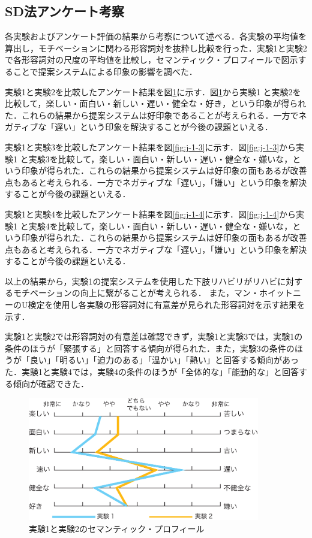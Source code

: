 \subsection{SD法アンケート考察}
各実験およびアンケート評価の結果から考察について述べる．各実験の平均値\cite{average}を算出し，モチベーションに関わる形容詞対を抜粋し比較を行った．実験1と実験2で各形容詞対の尺度の平均値を比較し，セマンティック・プロフィール\cite{sd_zu}で図示することで提案システムによる印象の影響を調べた．

実験1と実験2を比較したアンケート結果を図\ref{fig:j-1-2}に示す．図\ref{fig:j-1-2}から実験1 と実験2を比較して，楽しい・面白い・新しい・遅い・健全な・好き，という印象が得られた．これらの結果から提案システムは好印象であることが考えられる．一方でネガティブな「遅い」という印象を解決することが今後の課題といえる．


実験1と実験3を比較したアンケート結果を図\ref{fig:j-1-3}に示す．図\ref{fig:j-1-3}から実験1 と実験3を比較して，楽しい・面白い・新しい・遅い・健全な・嫌いな，という印象が得られた．これらの結果から提案システムは好印象の面もあるが改善点もあると考えられる．一方でネガティブな「遅い」，「嫌い」という印象を解決することが今後の課題といえる．


実験1と実験4を比較したアンケート結果を図\ref{fig:j-1-4}に示す．図\ref{fig:j-1-4}から実験1 と実験4を比較して，楽しい・面白い・新しい・遅い・健全な・嫌いな，という印象が得られた．これらの結果から提案システムは好印象の面もあるが改善点もあると考えられる．一方でネガティブな「遅い」，「嫌い」という印象を解決することが今後の課題といえる．


以上の結果から，実験1の提案システムを使用した下肢リハビリがリハビに対するモチベーションの向上に繋がることが考えられる．
また，マン・ホイットニーのU検定\cite{U検定}を使用し各実験の形容詞対に有意差が見られた形容詞対を示す結果を示す．

実験1と実験2では形容詞対の有意差は確認できず，実験1と実験3では，実験1の条件のほうが「緊張する」と回答する傾向が得られた．また，実験3の条件のほうが「良い」「明るい」「迫力のある」「温かい」「熱い」と回答する傾向があった．実験1と実験4では，実験4の条件のほうが「全体的な」「能動的な」と回答する傾向が確認できた．
\begin{figure}[tbp]
	\centering
			\includegraphics[width=0.9\textwidth]{chap3-figure/j-1-2.eps}
	\caption{実験1と実験2のセマンティック・プロフィール}
	\label{fig:j-1-2}
\end{figure}


